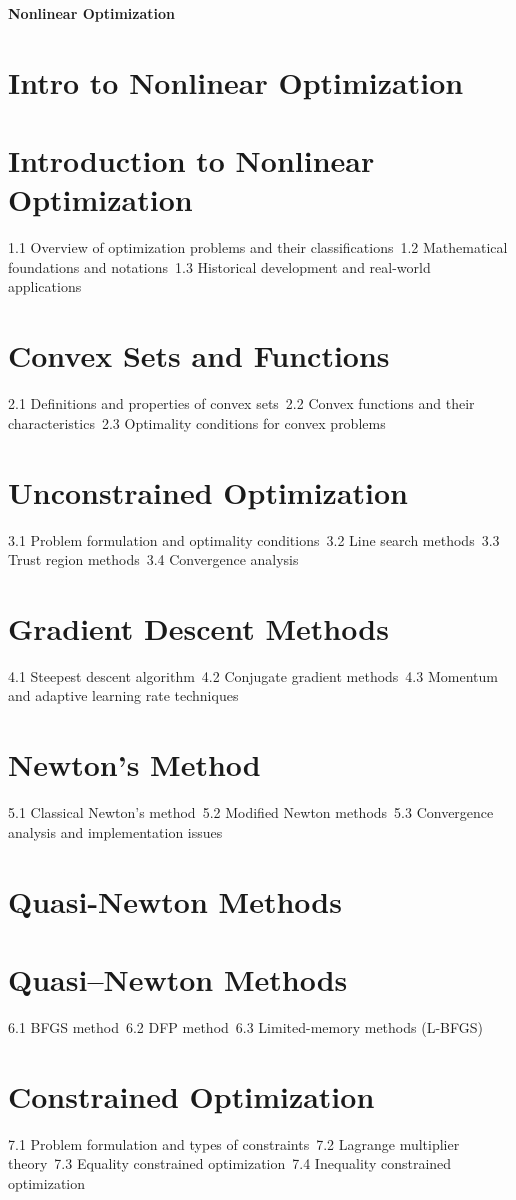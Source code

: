 {\LARGE \bf{Nonlinear Optimization}}
\section{Intro to Nonlinear Optimization}
\section{Introduction to Nonlinear Optimization}
1.1 Overview of optimization problems and their classifications\
1.2 Mathematical foundations and notations\
1.3 Historical development and real-world applications\
\section{Convex Sets and Functions}
2.1 Definitions and properties of convex sets\
2.2 Convex functions and their characteristics\
2.3 Optimality conditions for convex problems\
\section{Unconstrained Optimization}
3.1 Problem formulation and optimality conditions\
3.2 Line search methods\
3.3 Trust region methods\
3.4 Convergence analysis\
\section{Gradient Descent Methods}
4.1 Steepest descent algorithm\
4.2 Conjugate gradient methods\
4.3 Momentum and adaptive learning rate techniques\
\section{Newton's Method}
5.1 Classical Newton's method\
5.2 Modified Newton methods\
5.3 Convergence analysis and implementation issues\
\section{Quasi-Newton Methods}
\section{Quasi–Newton Methods}
6.1 BFGS method\
6.2 DFP method\
6.3 Limited-memory methods (L-BFGS)\
\section{Constrained Optimization}
7.1 Problem formulation and types of constraints\
7.2 Lagrange multiplier theory\
7.3 Equality constrained optimization\
7.4 Inequality constrained optimization\
